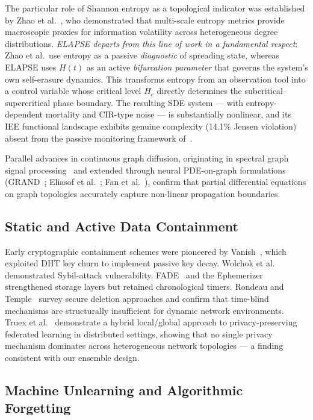 \documentclass[review,12pt]{elsarticle}
\newcommand{\Hc}{H_c}
\begin{document}
The particular role of Shannon entropy as a topological indicator was
established by Zhao et al.~\cite{zhao2024multi}, who demonstrated that
multi-scale entropy metrics provide macroscopic proxies for information volatility
across heterogeneous degree distributions. \emph{ELAPSE departs from this line
of work in a fundamental respect}: Zhao et al.\ use entropy as a passive
\emph{diagnostic} of spreading state, whereas ELAPSE uses $H(t)$ as an active
\emph{bifurcation parameter} that governs the system's own self-erasure dynamics.
This transforms entropy from an observation tool into a control variable whose
critical level $\Hc$ directly determines the subcritical--supercritical phase
boundary. The resulting SDE system --- with entropy-dependent mortality and
CIR-type noise --- is substantially nonlinear, and its IEE functional landscape
exhibits genuine complexity (14.1\% Jensen violation) absent from the passive
monitoring framework of~\cite{zhao2024multi}.

Parallel advances in continuous graph diffusion, originating in spectral graph
signal processing~\cite{shuman2013emerging} and extended through neural
PDE-on-graph formulations (GRAND~\cite{chamberlain2021grand};
Eliasof et al.~\cite{eliasof2024graph}; Fan et al.~\cite{fan2024graph}), confirm
that partial differential equations on graph topologies accurately capture
non-linear propagation boundaries.

\subsection{Static and Active Data Containment}

Early cryptographic containment schemes were pioneered by
Vanish~\cite{geambasu2009vanish}, which exploited DHT key churn to implement
passive key decay. Wolchok et al.~\cite{wolchok2010defeating} demonstrated
Sybil-attack vulnerability. FADE~\cite{tang2010fade} and the
Ephemerizer~\cite{perlman2005ephemerizer} strengthened storage layers but
retained chronological timers. Rondeau and Temple~\cite{rondeau2021secure}
survey secure deletion approaches and confirm that time-blind mechanisms are
structurally insufficient for dynamic network environments. Truex et al.~\cite{truex2019hybrid} demonstrate a hybrid local/global
approach to privacy-preserving federated learning in distributed settings,
showing that no single privacy mechanism dominates across heterogeneous
network topologies — a finding consistent with our ensemble design.

\subsection{Machine Unlearning and Algorithmic Forgetting}
\end{document}
